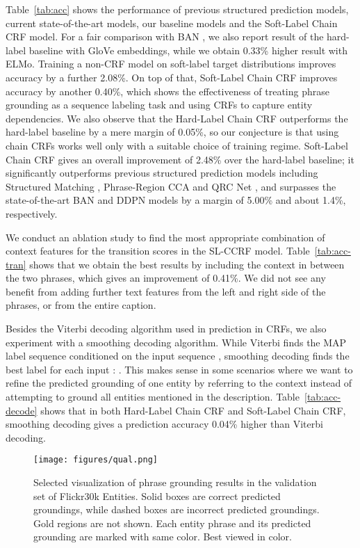 \documentclass[11pt,a4paper]{article}
\begin{document}
Table~\ref{tab:acc} shows the performance of previous structured prediction models, current state-of-the-art models, our baseline models and the Soft-Label Chain CRF model. For a fair comparison with BAN \cite{DBLP:conf/nips/KimJZ18}, we also report result of the hard-label baseline with GloVe \cite{DBLP:conf/emnlp/PenningtonSM14} embeddings, while we obtain 0.33\% higher result with ELMo. 
Training a non-CRF model on soft-label target distributions improves  accuracy by a further 2.08\%. On top of that, Soft-Label Chain CRF improves accuracy by another 0.40\%, which shows the effectiveness of treating phrase grounding as a sequence labeling task and using CRFs to capture entity dependencies. We also observe that the Hard-Label Chain CRF outperforms the hard-label baseline by a mere margin of 0.05\%, so our conjecture is that using chain CRFs works well only with a suitable choice of training regime. Soft-Label Chain CRF gives an overall improvement of 2.48\% over the hard-label baseline; it significantly outperforms previous structured prediction models including Structured Matching \cite{DBLP:conf/eccv/WangAKMD16}, Phrase-Region CCA \cite{DBLP:conf/iccv/PlummerMCHL17} and QRC Net \cite{DBLP:conf/iccv/ChenKN17}, and surpasses the state-of-the-art  BAN \cite{DBLP:conf/nips/KimJZ18} and DDPN \cite{DBLP:conf/ijcai/YuYXZ0T18} models by a margin of 5.00\% and about 1.4\%, respectively. 

We conduct an ablation study to find the most appropriate combination of context features for the transition scores in the SL-CCRF model. Table~\ref{tab:acc-tran} shows that we obtain the best results by including the context in between the two phrases, which gives an improvement of 0.41\%. We did not see any benefit from adding further text features from the left and right side of the phrases, or from the entire caption. 

Besides the Viterbi decoding algorithm used in prediction in CRFs, we also experiment with a smoothing decoding algorithm. While Viterbi finds the MAP label sequence conditioned on the input sequence , smoothing decoding finds the best label for each input : . This makes sense in some scenarios where we want to refine the predicted grounding of one entity by referring to the context instead of attempting to ground all entities mentioned in the description. Table~\ref{tab:acc-decode} shows that in both Hard-Label Chain CRF and Soft-Label Chain CRF, smoothing decoding gives a prediction accuracy 0.04\% higher than Viterbi decoding. 

\begin{figure*}[t]
    \centering
    \texttt{[image: figures/qual.png]}
    \caption{Selected visualization of phrase grounding results in the validation set of Flickr30k Entities. Solid boxes are correct predicted groundings, while dashed boxes are incorrect predicted groundings. Gold regions are not shown. Each entity phrase and its predicted grounding are marked with same color. Best viewed in color. }
    \label{fig:qual}
\end{figure*}
\end{document}
